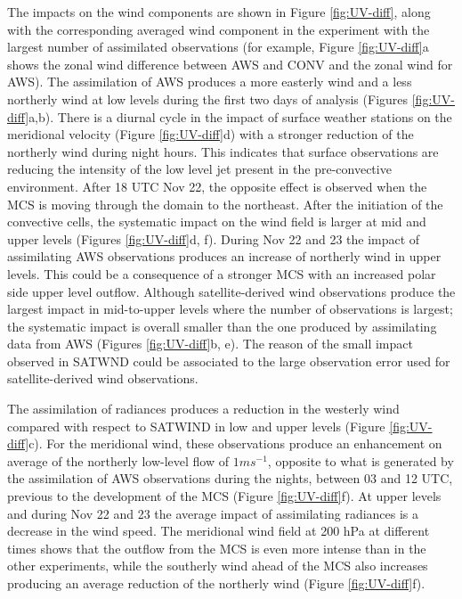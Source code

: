 \documentclass[final,5p,times,twocolumn,authoryear]{elsarticle} %
\begin{document}
The impacts on the wind components are shown in Figure \ref{fig:UV-diff}, along with the corresponding averaged wind component in the experiment with the largest number of assimilated observations (for example, Figure \ref{fig:UV-diff}a shows the zonal wind difference between AWS and CONV and the zonal wind for AWS). The assimilation of AWS produces a more easterly wind and a less northerly wind at low levels during the first two days of analysis (Figures \ref{fig:UV-diff}a,b). There is a diurnal cycle in the impact of surface weather stations on the meridional velocity (Figure \ref{fig:UV-diff}d) with a stronger reduction of the northerly wind during night hours. This indicates that surface observations are reducing the intensity of the low level jet present in the pre-convective environment. After 18 UTC Nov 22, the opposite effect is observed when the MCS is moving through the domain to the northeast. After the initiation of the convective cells, the systematic impact on the wind field is larger at mid and upper levels (Figures \ref{fig:UV-diff}d, f). During Nov 22 and 23 the impact of assimilating AWS observations produces an increase of northerly wind in upper levels. This could be a consequence of a stronger MCS with an increased polar side upper level outflow. Although satellite-derived wind observations produce the largest impact in mid-to-upper levels where the number of observations is largest; the systematic impact is overall smaller than the one produced by assimilating data from AWS (Figures \ref{fig:UV-diff}b, e). The reason of the small impact observed in SATWND could be associated to the large observation error used for satellite-derived wind observations.

The assimilation of radiances produces a reduction in the westerly wind compared with respect to SATWIND in low and upper levels (Figure \ref{fig:UV-diff}c). For the meridional wind, these observations produce an enhancement on average of the northerly low-level flow of \(1 ms^{-1}\), opposite to what is generated by the assimilation of AWS observations during the nights, between 03 and 12 UTC, previous to the development of the MCS (Figure \ref{fig:UV-diff}f). At upper levels and during Nov 22 and 23 the average impact of assimilating radiances is a decrease in the wind speed. The meridional wind field at 200 hPa at different times shows that the outflow from the MCS is even more intense than in the other experiments, while the southerly wind ahead of the MCS also increases producing an average reduction of the northerly wind (Figure \ref{fig:UV-diff}f).
\end{document}
